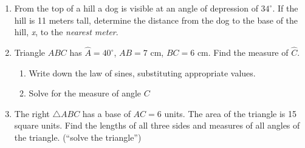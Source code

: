 \documentclass[12pt, twoside]{article}
\begin{document}
\begin{enumerate}
\item From the top of a hill a dog is visible at an angle of depression of $34^\circ$. If the hill is 11 meters tall, determine the distance from the dog to the base of the hill, \emph{x}, to the \emph{nearest meter}.
\begin{flushright}
  \end{flushright} \vspace{4cm}
  
\newpage
\item Triangle $ABC$ has $\hat{A}=40^\circ$, $AB=7 \text{ cm}$, $BC=6 \text{ cm}$. Find the measure of $\hat{C}$.
  \begin{enumerate}[itemsep=3cm]
        \item Write down the law of sines, substituting appropriate values.
        \item Solve for the measure of angle $C$
  \end{enumerate}
  \begin{flushright}
  \end{flushright}\vspace{2cm}

\item The right $\triangle ABC$ has a base of $AC=6$ units. The area of the triangle is 15 square units. Find the lengths of all three sides and measures of all angles of the triangle. (``solve the triangle'')
  \begin{flushright}
  \end{flushright}
 


\end{enumerate}
\end{document}
